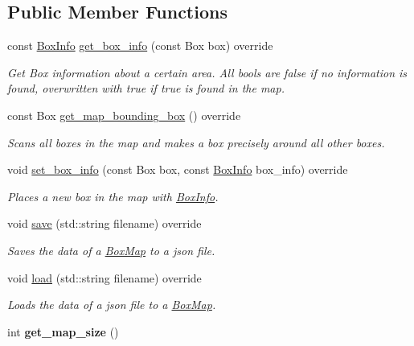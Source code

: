 \subsection*{Public Member Functions}
\begin{DoxyCompactItemize}
\item 
const \hyperlink{classr2d2_1_1_box_info}{Box\+Info} \hyperlink{classr2d2_1_1_box_map_aa6fd512737ad45da9bc46a516807f71e}{get\+\_\+box\+\_\+info} (const Box box) override
\begin{DoxyCompactList}\small\item\em Get Box information about a certain area. All bools are false if no information is found, overwritten with true if true is found in the map. \end{DoxyCompactList}\item 
const Box \hyperlink{classr2d2_1_1_box_map_ac1aea64a58cdb6916ecbcb0d2ea780c2}{get\+\_\+map\+\_\+bounding\+\_\+box} () override
\begin{DoxyCompactList}\small\item\em Scans all boxes in the map and makes a box precisely around all other boxes. \end{DoxyCompactList}\item 
void \hyperlink{classr2d2_1_1_box_map_ac421b31be9f2e2248127f21f3299883d}{set\+\_\+box\+\_\+info} (const Box box, const \hyperlink{classr2d2_1_1_box_info}{Box\+Info} box\+\_\+info) override
\begin{DoxyCompactList}\small\item\em Places a new box in the map with \hyperlink{classr2d2_1_1_box_info}{Box\+Info}. \end{DoxyCompactList}\item 
void \hyperlink{classr2d2_1_1_box_map_a23970768a8508c94ba88be91ab87d4ac}{save} (std\+::string filename) override
\begin{DoxyCompactList}\small\item\em Saves the data of a \hyperlink{classr2d2_1_1_box_map}{Box\+Map} to a json file. \end{DoxyCompactList}\item 
void \hyperlink{classr2d2_1_1_box_map_a4bc5818e4802d2d1b0a66c0d6c2bb0d0}{load} (std\+::string filename) override
\begin{DoxyCompactList}\small\item\em Loads the data of a json file to a \hyperlink{classr2d2_1_1_box_map}{Box\+Map}. \end{DoxyCompactList}\item 
\hypertarget{classr2d2_1_1_box_map_a2d5e901a18b8402156a9c29d802b0b06}{}int {\bfseries get\+\_\+map\+\_\+size} ()\label{classr2d2_1_1_box_map_a2d5e901a18b8402156a9c29d802b0b06}

\end{DoxyCompactItemize}


